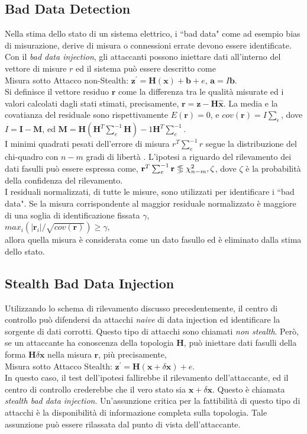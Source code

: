 \subsection{Bad Data Detection}
Nella stima dello stato di un sistema elettrico, i ``bad data" come ad esempio bias di misurazione, derive di misura o connessioni errate devono essere identificate. Con il \emph{bad data injection}, gli attaccanti possono iniettare dati all'interno del vettore di misure $r$ ed il sistema può essere descritto come\\
\indent Misura sotto Attacco non-Stealth: $\textbf{z}^\prime = \textbf{H}(\textbf{x}) + \textbf{b} + e$, $\textbf{a} = I\textbf{b}$.\\
Si definisce il vettore residuo $\textbf{r}$ come la differenza tra le qualità misurate ed i valori calcolati dagli stati stimati, precisamente, $\textbf{r} = \textbf{z} - \textbf{H}\widehat{\textbf{x}}$. La media e la covatianza del residuale sono rispettivamente $E(\textbf{r}) = 0$, e $cov(\textbf{r}) = I\sum_{\epsilon}$, dove $I = \textbf{I} - \textbf{M}$, ed $\textbf{M} = \textbf{H}(\textbf{H}^T\sum_e^{-1}\textbf{H})-1\textbf{H}^T\sum_e^{-1}$.\\
I minimi quadrati pesati dell'errore di misura $r^{T}\sum_{e}^{-1}r$ segue la distribuzione del chi-quadro con $n - m$ gradi di libertà \cite{monticelli}. L'ipotesi a riguardo del rilevamento dei dati fasulli può essere espressa come, $\textbf{r}^T\sum_{e}^{-1}\textbf{r} \ggll \chi_{n-m}^{2},\zeta$, dove $\zeta$ è la probabilità della confidenza del rilevamento.\\
I residuali normalizzati, di tutte le misure, sono utilizzati per identificare i ``bad data". Se la misura corrispondente al maggior residuale normalizzato è maggiore di una soglia di identificazione fissata $\gamma$, \\
\indent $max_i(|\textbf{r}_i|/\sqrt{cov(\textbf{r})}) \geq \gamma$,\\
allora quella misura è considerata come un dato fasullo ed è eliminato dalla stima dello stato.
\subsection{Stealth Bad Data Injection}
Utilizzando lo schema di rilevamento discusso precedentemente, il centro di controllo può difendersi da attacchi \emph{naive} di data injection ed identificare la sorgente di dati corrotti. Questo tipo di attacchi sono chiamati \emph{non stealth}. Però, se un attaccante ha conoscenza della topologia \textbf{H}, può iniettare dati fasulli della forma $\textbf{H}\delta\textbf{x}$ nella misura $\textbf{r}$, più precisamente,\\
\indent Misura sotto Attacco Stealth: $\textbf{z}^\prime = \textbf{H}(\textbf{x} + \delta\textbf{x}) + e$.\\
In questo caso, il test dell'ipotesi fallirebbe il rilevamento dell'attaccante, ed il centro di controllo crederebbe che il vero stato sia $\textbf{x} + \delta\textbf{x}$. Questo è chiamata \emph{stealth bad data injection}. Un'assunzione critica per la fattibilità di questo tipo di attacchi è la disponibilità di informazione completa sulla topologia. Tale assunzione può essere rilassata dal punto di vista dell'attaccante.
